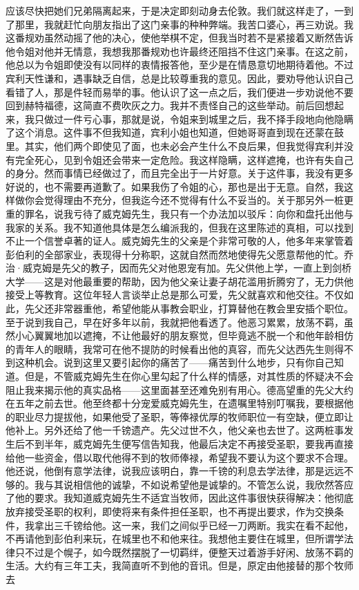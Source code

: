 {应该尽快把她们兄弟隔离起来，于是决定即刻动身去伦敦。我们就这样走了，一到了那里，我就赶忙向朋友指出了这门亲事的种种弊端。我苦口婆心，再三劝说。我这番规劝虽然动摇了他的决心，使他举棋不定，但我当时若不是紧接着又断然告诉他令姐对他并无情意，我想我那番规劝也许最终还阻挡不住这门亲事。在这之前，他总以为令姐即使没有以同样的衷情报答他，至少是在情恳意切地期待着他。不过宾利天性谦和，遇事缺乏自信，总是比较尊重我的意见。因此，要劝导他认识自己看错了人，那是件轻而易举的事。他认识了这一点之后，我们便进一步劝说他不要回到赫特福德，这简直不费吹灰之力。我并不责怪自己的这些举动。前后回想起来，我只做过一件亏心事，那就是说，令姐来到城里之后，我不择手段地向他隐瞒了这个消息。这件事不但我知道，宾利小姐也知道，但她哥哥直到现在还蒙在鼓里。其实，他们两个即使见了面，也未必会产生什么不良后果，但我觉得宾利并没有完全死心，见到令姐还会带来一定危险。我这样隐瞒，这样遮掩，也许有失自己的身分。然而事情已经做过了，而且完全出于一片好意。关于这件事，我没有更多好说的，也不需要再道歉了。如果我伤了令姐的心，那也是出于无意。自然，我这样做你会觉得理由不充分，但我迄今还不觉得有什么不妥当的。关于那另外一桩更重的罪名，说我亏待了威克姆先生，我只有一个办法加以驳斥：向你和盘托出他与我家的关系。我不知道他具体是怎么编派我的，但我在这里陈述的真相，可以找到不止一个信誉卓著的证人。威克姆先生的父亲是个非常可敬的人，他多年来掌管着彭伯利的全部家业，表现得十分称职，这就自然而然地使得先父愿意帮他的忙。乔治·威克姆是先父的教子，因而先父对他恩宠有加。先父供他上学，一直上到剑桥大学——这是对他最重要的帮助，因为他父亲让妻子胡花滥用折腾穷了，无力供他接受上等教育。这位年轻人言谈举止总是那么可爱，先父就喜欢和他交往。不仅如此，先父还非常器重他，希望他能从事教会职业，打算替他在教会里安插个职位。至于说到我自己，早在好多年以前，我就把他看透了。他恶习累累，放荡不羁，虽然小心翼翼地加以遮掩，不让他最好的朋友察觉，但毕竟逃不脱一个和他年龄相仿的青年人的眼睛，我常可在他不提防的时候看出他的真容，而先父达西先生则得不到这种机会。说到这里又要引起你的痛苦了——痛苦到什么地步，只有你自己知道。但是，不管威克姆先生在你心里勾起了什么样的情感，对其性质的怀疑决不会阻止我来揭示他的真实品格——这里面甚至还难免别有用心。德高望重的先父大约在五年之前去世。他至终都十分宠爱威克姆先生，在遗嘱里特别叮嘱我，要根据他的职业尽力提拔他，如果他受了圣职，等俸禄优厚的牧师职位一有空缺，便立即让他补上。另外还给了他一千镑遗产。先父过世不久，他父亲也去世了。这两桩事发生后不到半年，威克姆先生便写信告知我，他最后决定不再接受圣职，要我再直接给他一些资金，借以取代他得不到的牧师俸禄，希望我不要认为这个要求不合理。他还说，他倒有意学法律，说我应该明白，靠一千镑的利息去学法律，那是远远不够的。我与其说相信他的诚挚，不如说希望他是诚挚的。不管怎么说，我欣然答应了他的要求。我知道威克姆先生不适宜当牧师，因此这件事很快获得解决：他彻底放弃接受圣职的权利，即使将来有条件担任圣职，也不再提出要求，作为交换条件，我拿出三千镑给他。这一来，我们之间似乎已经一刀两断。我实在看不起他，不再请他到彭伯利来玩，在城里也不和他来往。我想他主要住在城里，但所谓学法律只不过是个幌子，如今既然摆脱了一切羁绊，便整天过着游手好闲、放荡不羁的生活。大约有三年工夫，我简直听不到他的音讯。但是，原定由他接替的那个牧师去}
